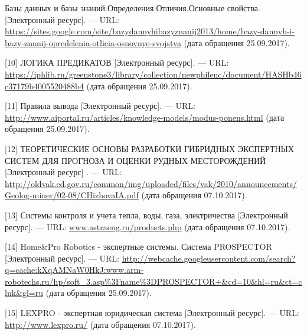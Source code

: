 \documentclass[14pt,a4paper,report]{report}
\begin{document}
\begin{flushleft}
[9] Базы данных и базы знаний.Определения.Отличия.Основные свойства. [Электронный ресурс]. — URL: \href{https://sites.google.com/site/bazydannyhibazyznanij2013/home/bazy-dannyh-i-bazy-znanij-opredelenia-otlicia-osnovnye-svojstva}{https://sites.google.com/site/bazydannyhibazyznanij2013/home/bazy-dannyh-i-bazy-znanij-opredelenia-otlicia-osnovnye-svojstva} (дата обращения 25.09.2017). \linebreak

[10] ЛОГИКА ПРЕДИКАТОВ [Электронный ресурс]. — URL: \href{https://iphlib.ru/greenstone3/library/collection/newphilenc/document/HASHb46c37179b4005520488b4}{https://iphlib.ru/greenstone3/library/collection/newphilenc/document/HASHb46c37179b4005520488b4} (дата обращения 25.09.2017). \linebreak

[11] Правила вывода [Электронный ресурс]. — URL: \href{http://www.aiportal.ru/articles/knowledge-models/modus-ponens.html}{http://www.aiportal.ru/articles/knowledge-models/modus-ponens.html} (дата обращения 25.09.2017). \linebreak

[12] ТЕОРЕТИЧЕСКИЕ ОСНОВЫ РАЗРАБОТКИ ГИБРИДНЫХ ЭКСПЕРТНЫХ СИСТЕМ ДЛЯ ПРОГНОЗА И ОЦЕНКИ РУДНЫХ МЕСТОРОЖДЕНИЙ [Электронный ресурс] . — URL: \href{http://oldvak.ed.gov.ru/common/img/uploaded/files/vak/2010/announcements/Geolog-miner/02-08/CHizhovaIA.pdf}{http://oldvak.ed.gov.ru/common/img/uploaded/files/vak/2010/announcements/Geolog-miner/02-08/CHizhovaIA.pdf} (дата обращения 07.10.2017). \linebreak

[13] Системы контроля и учета тепла, воды, газа, электричества [Электронный ресурс]. — URL: \href{www.astraeng.ru/products.php}{www.astraeng.ru/products.php} (дата обращения 07.10.2017).  \linebreak

[14] Home\&Pro Robotics - экспертные системы. Система PROSPECTOR [Электронный ресурс]. — URL: \href{http://webcache.googleusercontent.com/search?q=cache:kXqAMNaW0HkJ:www.arm-robotechs.ru/hp/soft\_3.asp\%3Fname\%3DPROSPECTOR+\&cd=10\&hl=ru\&ct=clnk\&gl=ru}{http://webcache.googleusercontent.com/search?q=cache:kXqAMNaW0HkJ:www.arm-robotechs.ru/hp/soft\_3.asp\%3Fname\%3DPROSPECTOR+\&cd=10\&hl=ru\&ct=clnk\&gl=ru} (дата обращения 25.09.2017). \linebreak

[15] LEXPRO - экспертная юридическая система [Электронный ресурс]. — URL: \href{http://www.lexpro.ru/}{http://www.lexpro.ru/} (дата обращения 07.10.2017).  \linebreak


\end{flushleft}
\end{document}
